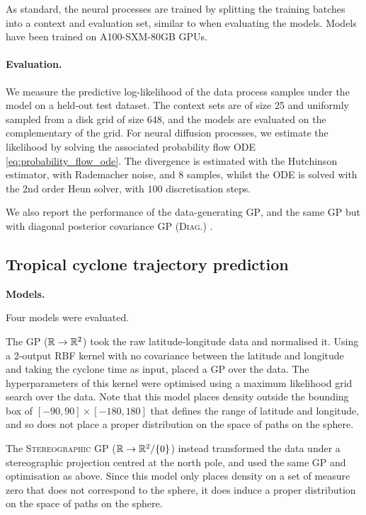 As standard, the neural processes are trained by splitting the training batches into a context and evaluation set, similar to when evaluating the models.
Models have been trained on A100-SXM-80GB GPUs.

\paragraph{Evaluation.}
We measure the predictive log-likelihood of the data process samples under the model on a held-out test dataset.
The context sets are of size 25 and uniformly sampled from a disk grid of size $648$, and the models are evaluated on the complementary of the grid.
For neural diffusion processes, we estimate the likelihood by solving the associated probability flow ODE \eqref{eq:probability_flow_ode}.
The divergence is estimated with the Hutchinson estimator, with Rademacher noise, and 8 samples, whilst the ODE is solved with the 2nd order Heun solver, with $100$ discretisation steps.

We also report the performance of the data-generating {\scshape GP}, and the same GP but with diagonal posterior covariance {\scshape GP (Diag.)
	}.

\subsection{Tropical cyclone trajectory prediction}
\label{sec:cyclonedetail}

\textbf{Models. }

Four models were evaluated.

The \textsc{GP ($\mathbb{R}\to\mathbb{R}^2$)} took the raw latitude-longitude data and normalised it.
Using a 2-output RBF kernel with no covariance between the latitude and longitude and taking the cyclone time as input, placed a GP over the data.
The hyperparameters of this kernel were optimised using a maximum likelihood grid search over the data.
Note that this model places density outside the bounding box of $[-90, 90] \times [-180, 180]$ that defines the range of latitude and longitude, and so does not place a proper distribution on the space of paths on the sphere.

The \textsc{Stereographic GP ($\mathbb{R} \to \mathbb{R}^2/\{0\}$)} instead transformed the data under a stereographic projection centred at the north pole, and used the same GP and optimisation as above.
Since this model only places density on a set of measure zero that does not correspond to the sphere, it does induce a proper distribution on the space of paths on the sphere.

